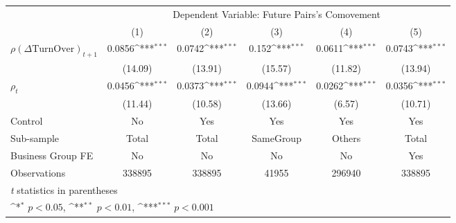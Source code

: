 {
\def\sym#1{\ifmmode^{#1}\else\(^{#1}\)\fi}
\begin{tabular}{l*{5}{c}}
\hline\hline
                    &\multicolumn{5}{c}{Dependent Variable:  Future Pairs's Comovement}                                           \\\cmidrule(lr){2-6}
                    &\multicolumn{1}{c}{(1)}         &\multicolumn{1}{c}{(2)}         &\multicolumn{1}{c}{(3)}         &\multicolumn{1}{c}{(4)}         &\multicolumn{1}{c}{(5)}         \\
\hline
 $ {\rho(\Delta \text{TurnOver})_{t+1}} $ &      0.0856\sym{***}&      0.0742\sym{***}&       0.152\sym{***}&      0.0611\sym{***}&      0.0743\sym{***}\\
                    &     (14.09)         &     (13.91)         &     (15.57)         &     (11.82)         &     (13.94)         \\
[1em]
 $ {\rho_t} $       &      0.0456\sym{***}&      0.0373\sym{***}&      0.0944\sym{***}&      0.0262\sym{***}&      0.0356\sym{***}\\
                    &     (11.44)         &     (10.58)         &     (13.66)         &      (6.57)         &     (10.71)         \\
\hline
Control             &          No         &         Yes         &         Yes         &         Yes         &         Yes         \\
Sub-sample          &       Total         &       Total         &   SameGroup         &      Others         &       Total         \\
Business Group FE   &          No         &          No         &          No         &          No         &         Yes         \\
Observations        &      338895         &      338895         &       41955         &      296940         &      338895         \\
\hline\hline
\multicolumn{6}{l}{\footnotesize \textit{t} statistics in parentheses}\\
\multicolumn{6}{l}{\footnotesize \sym{*} \(p<0.05\), \sym{**} \(p<0.01\), \sym{***} \(p<0.001\)}\\
\end{tabular}
}
